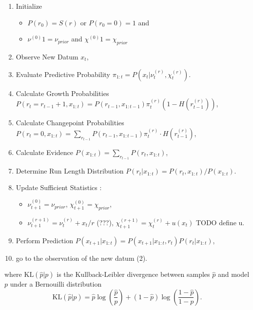 \documentclass[profile,final,english, draft]{article}%
\newcommand{\KL}[2]{\text{KL}( #1 | #2 )}
\newcommand{\pa}[1]{\left( #1 \right)}
\newcommand{\Jj}{\mathcal{J}}
\newcommand{\seeApp}[1]{Appendix~\ref{app:#1}}
\begin{document}
\begin{enumerate}
	\item     Initialize

	\begin{itemize}
		\item    $P(r_0)= S(r)$ or $P(r_0=0)=1$ and
		\item    $\nu^{(0)}1 = \nu_{prior}$ and $\chi^{(0)}1 = \chi_{prior}$
	\end{itemize}

	\item    Observe New Datum $x_t$,
    \item    Evaluate Predictive Probability $\pi_{1:t} = P(x_t |\nu^{(r)}_t,\chi^{(r)}_t)$.
    \item    Calculate Growth Probabilities $P(r_t=r_{t-1}+1, x_{1:t}) = P(r_{t-1}, x_{1:t-1}) \pi^{(r)}_t (1-H(r^{(r)}_{t-1}))$,
    \item    Calculate Changepoint Probabilities $P(r_t=0, x_{1:t})= \sum_{r_{t-1}} P(r_{t-1}, x_{1:t-1}) \pi^{(r)}_t \cdot H(r^{(r)}_{t-1})$,
    \item    Calculate Evidence $P(x_{1:t}) = \sum_{r_{t-1}} P (r_t, x_{1:t})$,
    \item    Determine Run Length Distribution $P (r_t | x_{1:t}) = P (r_t, x_{1:t})/P (x_{1:t}) $.
    \item    Update Sufficient Statistics :
	\begin{itemize}
		\item    $\nu^{(0)}_{t+1} = \nu_{prior}$, $\chi^{(0)}_{t+1} = \chi_{prior}$,
		\item    $\nu^{(r+1)}_{t+1} = \nu^{(r)}_{t} + x_t/r$ (???), $\chi^{(r+1)}_{t+1} = \chi^{(r)}_{t} + u(x_t)$ TODO define u.
	\end{itemize}

    \item    Perform Prediction $P (x_{t+1} | x_{1:t}) = P (x_{t+1}|x_{1:t} , r_t) P (r_t|x_{1:t})$,
    \item    go to the observation of the new datum (2).
\end{enumerate}





where $\KL{\hat p}{p}$ is the Kullback-Leibler divergence between samples $\hat p$ and model $p$ under a Bernouilli distribution
\begin{equation}
\KL{\hat p}{p} = \hat{p} \log\pa{\frac{\hat p}{p}} + (1-\hat p) \log\pa{\frac{1-\hat p}{1-p}}.
\end{equation}
\end{document}
